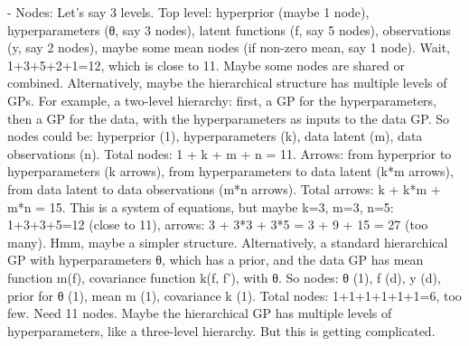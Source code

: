 - Nodes: Let's say 3 levels. Top level: hyperprior (maybe 1 node), hyperparameters (θ, say 3 nodes), latent functions (f, say 5 nodes), observations (y, say 2 nodes), maybe some mean nodes (if non-zero mean, say 1 node). Wait, 1+3+5+2+1=12, which is close to 11. Maybe some nodes are shared or combined. Alternatively, maybe the hierarchical structure has multiple levels of GPs. For example, a two-level hierarchy: first, a GP for the hyperparameters, then a GP for the data, with the hyperparameters as inputs to the data GP. So nodes could be: hyperprior (1), hyperparameters (k), data latent (m), data observations (n). Total nodes: 1 + k + m + n = 11. Arrows: from hyperprior to hyperparameters (k arrows), from hyperparameters to data latent (k*m arrows), from data latent to data observations (m*n arrows). Total arrows: k + k*m + m*n = 15. This is a system of equations, but maybe k=3, m=3, n=5: 1+3+3+5=12 (close to 11), arrows: 3 + 3*3 + 3*5 = 3 + 9 + 15 = 27 (too many). Hmm, maybe a simpler structure. Alternatively, a standard hierarchical GP with hyperparameters θ, which has a prior, and the data GP has mean function m(f), covariance function k(f, f'), with θ. So nodes: θ (1), f (d), y (d), prior for θ (1), mean m (1), covariance k (1). Total nodes: 1+1+1+1+1+1=6, too few. Need 11 nodes. Maybe the hierarchical GP has multiple levels of hyperparameters, like a three-level hierarchy. But this is getting complicated.

